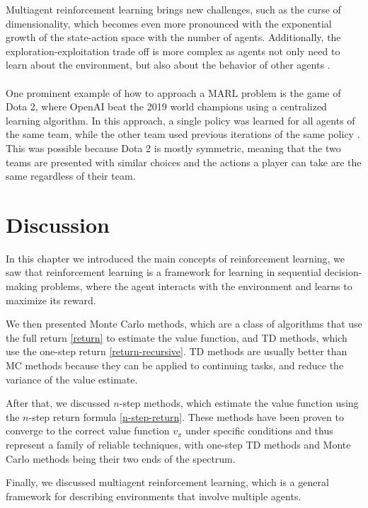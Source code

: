 Multiagent reinforcement learning brings new challenges, such as the curse of dimensionality, which becomes even more pronounced with the exponential growth of the state-action space with the number of agents. Additionally, the exploration-exploitation trade off is more complex as agents not only need to learn about the environment, but also about the behavior of other agents \cite{marl}.\\\\
One prominent example of how to approach a MARL problem is the game of Dota 2, where OpenAI beat the 2019 world champions using a centralized learning algorithm. In this approach, a single policy was learned for all agents of the same team, while the other team used previous iterations of the same policy \cite{open-ai-five}. This was possible because Dota 2 is mostly symmetric, meaning that the two teams are presented with similar choices and the actions a player can take are the same regardless of their team.

\section{Discussion}
In this chapter we introduced the main concepts of reinforcement learning, we saw that reinforcement learning is a framework for learning in sequential decision-making problems, where the agent interacts with the environment and learns to maximize its reward.

We then presented Monte Carlo methods, which are a class of algorithms that use the full return \eqref{return} to estimate the value function, and TD methods, which use the one-step return \eqref{return-recursive}. TD methods are usually better than MC methods because they can be applied to continuing tasks, and reduce the variance of the value estimate.

After that, we discussed $n$-step methods, which estimate the value function using the $n$-step return formula \eqref{n-step-return}. These methods have been proven to converge to the correct value function $v_{\pi}$ under specific conditions and thus represent a family of reliable techniques, with one-step TD methods and Monte Carlo methods being their two ends of the spectrum.

Finally, we discussed multiagent reinforcement learning, which is a general framework for describing environments that involve multiple agents.%
